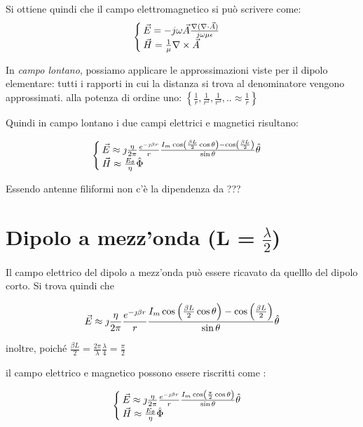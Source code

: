 Si ottiene quindi che il campo elettromagnetico si può scrivere come:
\begin{equation}
\begin{cases}\vec{E} = -j \omega \vec{A} \frac{\nabla(\nabla\cdot \vec{A})}{j \omega \mu \epsilon} \\
\vec{H} = \frac{1}{\mu} \nabla\times \vec{A} \end{cases}
\end{equation}

In \textit{campo lontano}, possiamo applicare le approssimazioni viste per il dipolo elementare: tutti i rapporti in cui la distanza si trova al denominatore vengono approssimati. alla potenza di ordine uno:    $\left\{ \frac{1}{r}, \frac{1}{r^2},\frac{1}{r^3},.. \approx \frac{1}{r}\right\}$

Quindi in campo lontano i due campi elettrici e magnetici risultano:

\begin{equation}\begin{cases}
  \vec{E} \approx \jmath \frac{\eta}{2 \pi} \frac{e^{-\jmath \beta r}}{r} \frac{I_m \cos \left(\frac{\beta L}{2} \cos \theta \right) - \cos \left(\frac{\beta L}{2} \right)}{\sin \theta} \hat{\theta} \\
  \vec{H} \approx \frac{E_{\theta}}{\eta} \hat{\Phi}
\end{cases}\end{equation}

Essendo antenne filiformi non c'è la dipendenza da ???



\section{Dipolo a mezz'onda (L = $\frac{\lambda}{2}$)}

Il campo elettrico del dipolo a mezz'onda può essere ricavato da quelllo del dipolo corto. Si trova quindi che

\begin{equation}
\vec{E} \approx \jmath \frac{\eta}{2 \pi} \frac{e^{-\jmath \beta r}}{r} \frac{I_m \cos \left(\frac{\beta L}{2} \cos \theta \right) - \cos \left(\frac{\beta L}{2} \right)}{\sin \theta} \hat{\theta}
\end{equation}

inoltre, poiché $\frac{\beta L}{2} = \frac{2 \pi}{\lambda} \frac{\lambda}{4} = \frac{\pi}{2}$

il campo elettrico e magnetico possono essere riscritti come :

\begin{equation}\begin{cases}
  \vec{E} \approx \jmath \frac{\eta}{2 \pi} \frac{e^{-\jmath \beta r}}{r} \frac{I_m \cos \left(\frac{\pi}{2} \cos \theta \right)}{\sin \theta} \hat{\theta} \\
  \vec{H} \approx \frac{E_{\theta}}{\eta} \hat{\Phi}
\end{cases}\end{equation}

